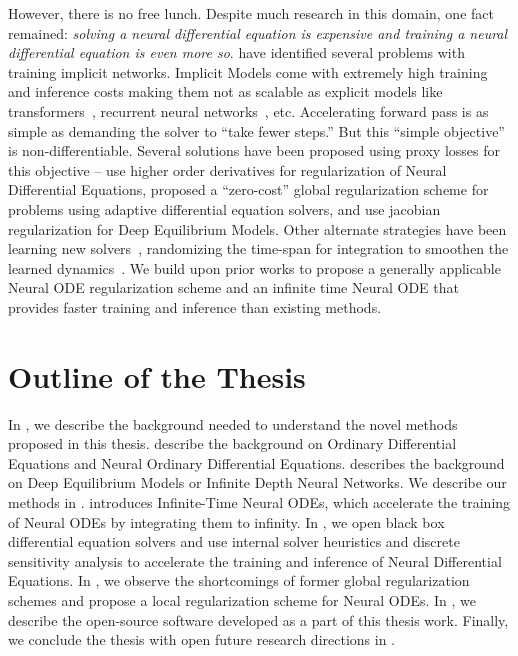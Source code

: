 However, there is no free lunch. Despite much research in this domain, one fact remained: \textit{solving a neural differential equation is expensive and training a neural differential equation is even more so}. \citet{grathwohl2018ffjord, dupont2019augmented, kelly2020learning, finlay2020train} have identified several problems with training implicit networks. Implicit Models come with extremely high training and inference costs making them not as scalable as explicit models like transformers~\citep{chen2016attention, vaswani2017attention}, recurrent neural networks~\citep{elman1990finding, hochreiter1997long}, etc. Accelerating forward pass is as simple as demanding the solver to ``take fewer steps.'' But this ``simple objective'' is non-differentiable. Several solutions have been proposed using proxy losses for this objective -- \citet{kelly2020learning, finlay2020train} use higher order derivatives for regularization of Neural Differential Equations, \citet{pal2021opening} proposed a ``zero-cost'' global regularization scheme for problems using adaptive differential equation solvers, and \citet{bai2021stabilizing} use jacobian regularization for Deep Equilibrium Models. Other alternate strategies have been learning new solvers~\citep{poli2020hypersolvers}, randomizing the time-span for integration to smoothen the learned dynamics~\citep{ghosh2020steer}. We build upon prior works to propose a generally applicable Neural ODE regularization scheme and an infinite time Neural ODE that provides faster training and inference than existing methods.

\section{Outline of the Thesis}

In , we describe the background needed to understand the novel methods proposed in this thesis.  describe the background on Ordinary Differential Equations and Neural Ordinary Differential Equations.  describes the background on Deep Equilibrium Models or Infinite Depth Neural Networks. We describe our methods in .  introduces Infinite-Time Neural ODEs, which accelerate the training of Neural ODEs by integrating them to infinity. In , we open black box differential equation solvers and use internal solver heuristics and discrete sensitivity analysis to accelerate the training and inference of Neural Differential Equations. In , we observe the shortcomings of former global regularization schemes and propose a local regularization scheme for Neural ODEs. In , we describe the open-source software developed as a part of this thesis work. Finally, we conclude the thesis with open future research directions in .

